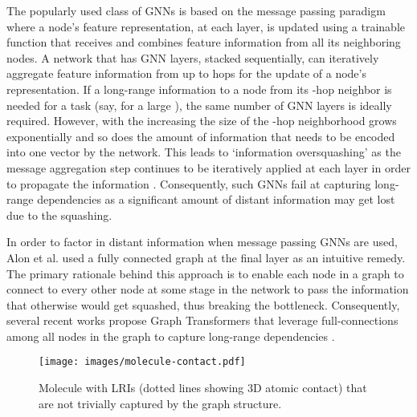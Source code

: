 \documentclass{article}
\begin{document}
The popularly used class of GNNs is based on the message passing paradigm \cite{gilmer2017neural_mpnn} where a node's feature representation, at each layer, is updated using a trainable function that receives and combines feature information from all its neighboring nodes. A network that has  GNN layers, stacked sequentially, can iteratively aggregate feature information from up to  hops for the update of a node's representation. If a long-range information to a node from its -hop neighbor is needed for a task (say, for a large ), the same number of GNN layers is ideally required. However, with the increasing  the size of the -hop neighborhood grows exponentially and so does the amount of information that needs to be encoded into one vector by the network. This leads to `information oversquashing' as the message aggregation step continues to be iteratively applied at each layer in order to propagate the information \cite{alon2020bottleneck}. Consequently, such GNNs fail at capturing long-range dependencies as a significant amount of distant information may get lost due to the squashing.

In order to factor in distant information when message passing GNNs are used, Alon et al. \cite{alon2020bottleneck} used a fully connected graph at the final layer as an intuitive remedy. The primary rationale behind this approach is to enable each node in a graph to connect to every other node at some stage in the network to pass the information that otherwise would get squashed, thus breaking the bottleneck. Consequently, several recent works propose Graph Transformers that leverage full-connections among all nodes in the graph to capture long-range dependencies \cite{kreuzer2021rethinking, ying2021transformers, mialon2021graphit}. 

\begin{wrapfigure}{r}{0.27\textwidth}
    \vspace{-6pt}
    \centering
    \texttt{[image: images/molecule-contact.pdf]}
    \label{fig:molecule-contact}
    \vspace{-15pt}
    \caption{
Molecule with LRIs (dotted lines showing 3D atomic contact) that are not trivially captured by the graph structure.
    }
\end{wrapfigure}
\end{document}
